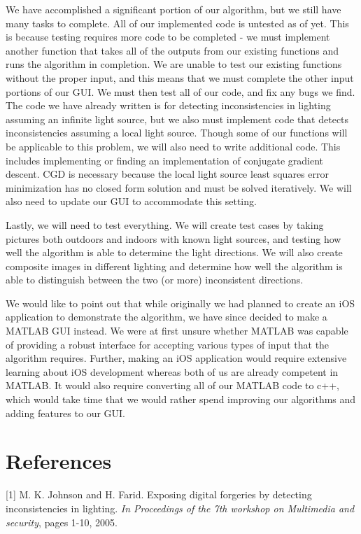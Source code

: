 \documentclass[10pt,twocolumn,letterpaper]{article}
\begin{document}
We have accomplished a significant portion of our algorithm, but we still have many tasks to complete. All of our implemented code is untested as of yet. This is because testing requires more code to be completed - we must implement another function that takes all of the outputs from our existing functions and runs the algorithm in completion. We are unable to test our existing functions without the proper input, and this means that we must complete the other input portions of our GUI. We must then test all of our code, and fix any bugs we find. The code we have already written is for detecting inconsistencies in lighting assuming an infinite light source, but we also must implement code that detects inconsistencies assuming a local light source. Though some of our functions will be applicable to this problem, we will also need to write additional code. This includes implementing or finding an implementation of conjugate gradient descent. CGD is necessary because the local light source least squares error minimization has no closed form solution and must be solved iteratively. We will also need to update our GUI to accommodate this setting.

Lastly, we will need to test everything. We will create test cases by taking pictures both outdoors and indoors with known light sources, and testing how well the algorithm is able to determine the light directions. We will also create composite images in different lighting and determine how well the algorithm is able to distinguish between the two (or more) inconsistent directions.

We would like to point out that while originally we had planned to create an iOS application to demonstrate the algorithm, we have since decided to make a MATLAB GUI instead. We were at first unsure whether MATLAB was capable of providing a robust interface for accepting various types of input that the algorithm requires. Further, making an iOS application would require extensive learning about iOS development whereas both of us are already competent in MATLAB. It would also require converting all of our MATLAB code to c++, which would take time that we would rather spend improving our algorithms and adding features to our GUI.
\section{References}

[1] M. K. Johnson and H. Farid. Exposing digital forgeries by detecting inconsistencies in lighting. \emph{In Proceedings of the 7th workshop on Multimedia and security}, pages 1-10, 2005.
\end{document}
